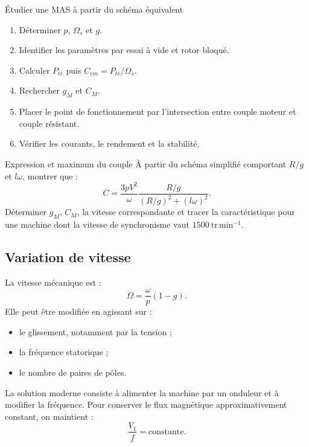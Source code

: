 \begin{TLMachineMethod}{Étudier une MAS à partir du schéma équivalent}
\begin{enumerate}
  \item Déterminer $p$, $\Omega_s$ et $g$.
  \item Identifier les paramètres par essai à vide et rotor bloqué.
  \item Calculer $P_{tr}$ puis $C_{em}=P_{tr}/\Omega_s$.
  \item Rechercher $g_M$ et $C_M$.
  \item Placer le point de fonctionnement par l'intersection entre couple moteur et couple résistant.
  \item Vérifier les courants, le rendement et la stabilité.
\end{enumerate}
\end{TLMachineMethod}

\begin{TLMachineExercise}{Expression et maximum du couple}
À partir du schéma simplifié comportant $R/g$ et $l\omega$, montrer que :
\[
C=\frac{3pV^2}{\omega}\frac{R/g}{(R/g)^2+(l\omega)^2}.
\]
Déterminer $g_M$, $C_M$, la vitesse correspondante et tracer la caractéristique pour une machine dont la vitesse de synchronisme vaut $1500\ \mathrm{tr\,min^{-1}}$.
\end{TLMachineExercise}

\subsection{Variation de vitesse}

La vitesse mécanique est :
\[
\boxed{\Omega=\frac{\omega}{p}(1-g).}
\]
Elle peut être modifiée en agissant sur :
\begin{itemize}
  \item le glissement, notamment par la tension ;
  \item la fréquence statorique ;
  \item le nombre de paires de pôles.
\end{itemize}

La solution moderne consiste à alimenter la machine par un onduleur et à modifier la fréquence. Pour conserver le flux magnétique approximativement constant, on maintient :
\[
\boxed{\frac{V_1}{f}=\mathrm{constante}.}
\]

\begin{center}\TLCommandeVsurF\end{center}

